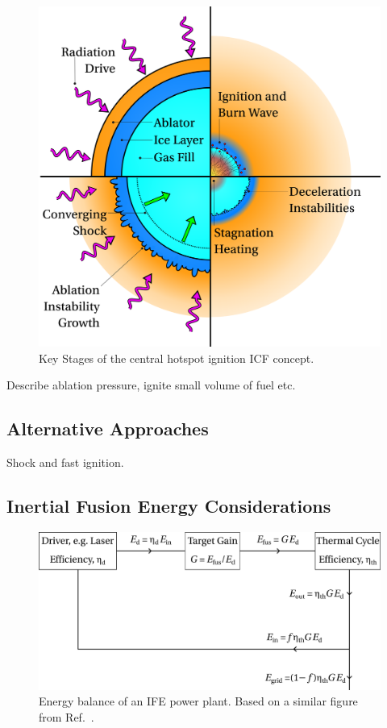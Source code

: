 \begin{figure}[t!]
    \includegraphics[width=0.7\linewidth]{Introduction/Images/hotspot ignition white.png}
    \centering
    \caption{Key Stages of the central hotspot ignition \ac{ICF} concept.
    }%
    \label{fig:intro_hotspot}
\end{figure}

Describe ablation pressure, ignite small volume of fuel etc.

\subsection{Alternative Approaches}%
\label{sec:intro_icf_alt}

Shock and fast ignition.

\subsection{Inertial Fusion Energy Considerations}%
\label{sec:intro_IFE_gain}

\begin{figure}[t!]
    \includegraphics[width=0.8\linewidth]{Introduction/Images/IFE_powerplant.png}
    \centering
    \caption{Energy balance of an \ac{IFE} power plant.
    Based on a similar figure from Ref.~\cite{atzeni_physics_2004}.
    }%
    \label{fig:intro_IFE_energy_balance}
\end{figure}

